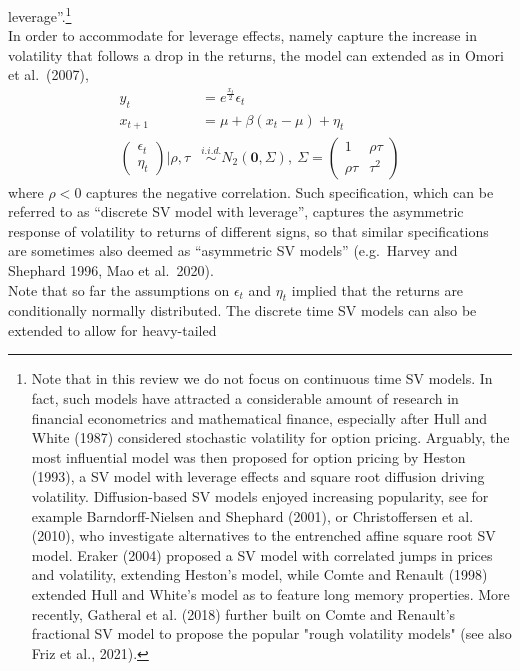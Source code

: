 \documentclass[
]{book}
\theoremstyle{break}
\theoremstyle{nonumberplain}
\begin{document}
leverage''.\footnote{Note that in this review we do not focus on continuous time SV models. In fact, such models have attracted a considerable amount of research in financial econometrics and mathematical finance, especially after Hull and White (1987) considered stochastic volatility for option pricing. Arguably, the most influential model was then proposed for option pricing by Heston (1993), a SV model with leverage effects and square root diffusion driving volatility. Diffusion-based SV models enjoyed increasing popularity, see for example Barndorff-Nielsen and Shephard (2001), or Christoffersen et al. (2010), who investigate alternatives to the entrenched affine square root SV model.  Eraker (2004) proposed a SV model with correlated jumps in prices and volatility, extending Heston's model, while Comte and Renault (1998) extended Hull and White's model as to feature long memory properties. More recently, Gatheral et al. (2018) further built on Comte and Renault's fractional SV model to propose the popular "rough volatility models" (see also Friz et al., 2021).}\\
In order to accommodate for leverage effects, namely capture the
increase in volatility that follows a drop in the returns, the model can
extended as in Omori et al.~(2007), \begin{align*}
    y_t & = e^{\frac{x_t}{2}}\epsilon_t\\
    x_{t+1} & = \mu+\beta(x_t-\mu)+\eta_t\\
    \begin{pmatrix}
       \epsilon_t \\
       \eta_t
    \end{pmatrix} \Big|\rho,\tau & \overset{i.i.d.}{\sim}  N_2(\mathbf{0},\Sigma), \ \Sigma=
    \begin{pmatrix}
       1 & \rho\tau \\
       \rho\tau & \tau^2
    \end{pmatrix}
\end{align*} where \(\rho<0\) captures the negative correlation. Such
specification, which can be referred to as ``discrete SV model with
leverage'', captures the asymmetric response of volatility to returns of
different signs, so that similar specifications are sometimes also
deemed as ``asymmetric SV models'' (e.g.~Harvey and Shephard 1996, Mao
et al.~2020).\\
Note that so far the assumptions on \(\epsilon_t\) and \(\eta_t\)
implied that the returns are conditionally normally distributed. The
discrete time SV models can also be extended to allow for heavy-tailed
\end{document}
